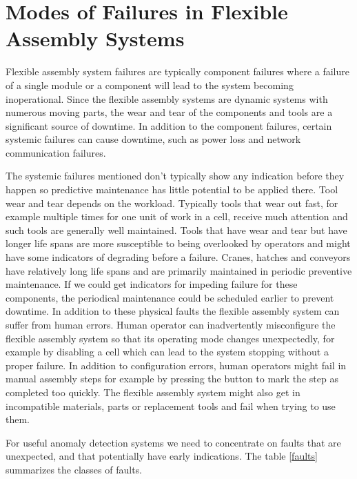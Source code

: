 \documentclass[journal]{IEEEtran}
\begin{document}
\section{Modes of Failures in Flexible Assembly Systems}

Flexible assembly system failures are typically component failures where a failure of a single module or a component will lead to the system becoming inoperational.
Since the flexible assembly systems are dynamic systems with numerous moving parts, the wear and tear of the components and tools are a significant source of downtime.
In addition to the component failures, certain systemic failures can cause downtime, such as power loss and network communication failures.

The systemic failures mentioned don't typically show any indication before they happen so predictive maintenance has little potential to be applied there. Tool wear and tear
depends on the workload. Typically tools that wear out fast, for example multiple times for one unit of work in a cell, receive much attention and such tools are generally
well maintained. Tools that have wear and tear but have longer life spans are more susceptible to being overlooked by operators and might have some indicators of degrading
before a failure. Cranes, hatches and conveyors have relatively long life spans and are primarily maintained in periodic preventive maintenance. If we could get indicators
for impeding failure for these components, the periodical maintenance could be scheduled earlier to prevent downtime. In addition to these physical faults the flexible
assembly system can suffer from human errors. Human operator can inadvertently misconfigure the flexible assembly system so that its operating mode changes unexpectedly,
for example by disabling a cell which can lead to the system stopping without a proper failure. In addition to configuration
errors, human operators might fail in manual assembly steps for example by pressing the button to mark the step
as completed too quickly.
The flexible assembly system might also get in incompatible materials, parts or replacement tools and fail when trying to use them.

For useful anomaly detection systems we need to concentrate on faults that are unexpected, and that potentially have early indications.
The table \ref{faults} summarizes the classes of faults.
\end{document}
